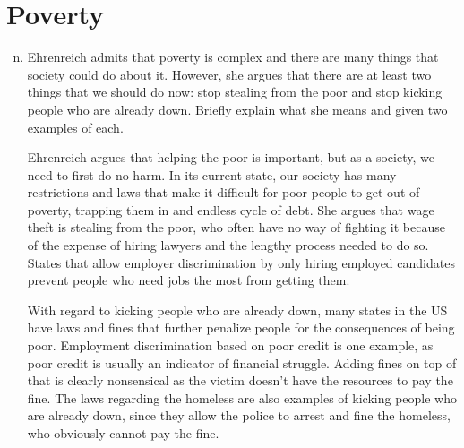 \documentclass{article}
\begin{document}
\section*{Poverty}
\begin{enumerate}[a)]
  \setcounter{enumi}{13}
  \item Ehrenreich admits that poverty is complex and there are many things that society could do about it. However, she argues that there are at least two things that we should do now: stop stealing from the poor and stop kicking people who are already down. Briefly explain what she means and given two examples of each.
  \par Ehrenreich argues that helping the poor is important, but as a society, we need to first do no harm. In its current state, our society has many restrictions and laws that make it difficult for poor people to get out of poverty, trapping them in and endless cycle of debt. She argues that wage theft is stealing from the poor, who often have no way of fighting it because of the expense of hiring lawyers and the lengthy process needed to do so. States that allow employer discrimination by only hiring employed candidates prevent people who need jobs the most from getting them.
  \par With regard to kicking people who are already down, many states in the US have laws and fines that further penalize people for the consequences of being poor. Employment discrimination based on poor credit is one example, as poor credit is usually an indicator of financial struggle. Adding fines on top of that is clearly nonsensical as the victim doesn't have the resources to pay the fine. The laws regarding the homeless are also examples of kicking people who are already down, since they allow the police to arrest and fine the homeless, who obviously cannot pay the fine.
\end{enumerate}
\end{document}
